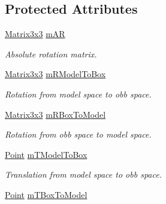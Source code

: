 \subsection*{Protected Attributes}
\begin{DoxyCompactItemize}
\item 
\hypertarget{class_o_b_b_collider_a3f2a35512d607384b9d24cc3b937aa16}{\hyperlink{class_matrix3x3}{Matrix3x3} \hyperlink{class_o_b_b_collider_a3f2a35512d607384b9d24cc3b937aa16}{m\+A\+R}}\label{class_o_b_b_collider_a3f2a35512d607384b9d24cc3b937aa16}

\begin{DoxyCompactList}\small\item\em Absolute rotation matrix. \end{DoxyCompactList}\item 
\hypertarget{class_o_b_b_collider_a43d821460eea05ea9e2dd86b5a5dcadf}{\hyperlink{class_matrix3x3}{Matrix3x3} \hyperlink{class_o_b_b_collider_a43d821460eea05ea9e2dd86b5a5dcadf}{m\+R\+Model\+To\+Box}}\label{class_o_b_b_collider_a43d821460eea05ea9e2dd86b5a5dcadf}

\begin{DoxyCompactList}\small\item\em Rotation from model space to obb space. \end{DoxyCompactList}\item 
\hypertarget{class_o_b_b_collider_a197766ce684173100fba6eaa7131e1a3}{\hyperlink{class_matrix3x3}{Matrix3x3} \hyperlink{class_o_b_b_collider_a197766ce684173100fba6eaa7131e1a3}{m\+R\+Box\+To\+Model}}\label{class_o_b_b_collider_a197766ce684173100fba6eaa7131e1a3}

\begin{DoxyCompactList}\small\item\em Rotation from obb space to model space. \end{DoxyCompactList}\item 
\hypertarget{class_o_b_b_collider_a5eb9ff0a018d75d717f193d390af58fc}{\hyperlink{class_point}{Point} \hyperlink{class_o_b_b_collider_a5eb9ff0a018d75d717f193d390af58fc}{m\+T\+Model\+To\+Box}}\label{class_o_b_b_collider_a5eb9ff0a018d75d717f193d390af58fc}

\begin{DoxyCompactList}\small\item\em Translation from model space to obb space. \end{DoxyCompactList}\item 
\hypertarget{class_o_b_b_collider_a0eb63cd1ff29e3fff66807c88f940162}{\hyperlink{class_point}{Point} \hyperlink{class_o_b_b_collider_a0eb63cd1ff29e3fff66807c88f940162}{m\+T\+Box\+To\+Model}}\label{class_o_b_b_collider_a0eb63cd1ff29e3fff66807c88f940162}


\end{DoxyCompactItemize}
